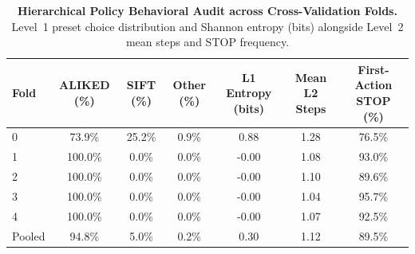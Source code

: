 \begin{table}[t]
\centering
\caption{\textbf{Hierarchical Policy Behavioral Audit across Cross-Validation Folds.} Level~1 preset choice distribution and Shannon entropy (bits) alongside Level~2 mean steps and STOP frequency.}
\label{tab:phase3_behavior}
\begin{tabular}{lcccccc}
\toprule
Fold & ALIKED (\%) & SIFT (\%) & Other (\%) & L1 Entropy (bits) & Mean L2 Steps & First-Action STOP (\%) \\
\midrule
0 & 73.9\% & 25.2\% & 0.9\% & 0.88 & 1.28 & 76.5\% \\
1 & 100.0\% & 0.0\% & 0.0\% & -0.00 & 1.08 & 93.0\% \\
2 & 100.0\% & 0.0\% & 0.0\% & -0.00 & 1.10 & 89.6\% \\
3 & 100.0\% & 0.0\% & 0.0\% & -0.00 & 1.04 & 95.7\% \\
4 & 100.0\% & 0.0\% & 0.0\% & -0.00 & 1.07 & 92.5\% \\
Pooled & 94.8\% & 5.0\% & 0.2\% & 0.30 & 1.12 & 89.5\% \\
\bottomrule
\end{tabular}
\end{table}